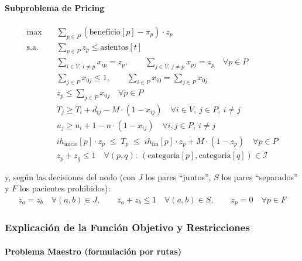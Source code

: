 \documentclass[12pt]{article}
\numberwithin{algorithm}{section}
\begin{document}
\paragraph{Subproblema de Pricing}

\begin{align}
  \max \quad & \sum_{p \in P} (\text{beneficio}[p] - \pi_p) \cdot z_p \label{eq:bp_pricing}\\
  \text{s.a.} \quad
  & \sum_{p \in P} z_p \leq \text{asientos}[t] \label{eq:pr_cap}\\
  & \sum_{i \in V,\, i \neq p} x_{ip} = z_p, \qquad \sum_{j \in V,\, j \neq p} x_{pj} = z_p \quad \forall p \in P \label{eq:pr_deg}\\
  & \sum_{j \in P} x_{0j} \leq 1, \qquad \sum_{i \in P} x_{i0} = \sum_{j \in P} x_{0j} \label{eq:pr_depot}\\
  & z_p \leq \sum_{j \in P} x_{0j} \quad \forall p \in P \label{eq:pr_ghost}\\
  & T_j \geq T_i + d_{ij} - M \cdot (1 - x_{ij}) \quad \forall i \in V,\ j \in P,\ i \neq j \label{eq:pr_time}\\
  & u_j \geq u_i + 1 - n \cdot (1 - x_{ij}) \quad \forall i, j \in P,\ i \neq j \label{eq:pr_mtz}\\
  & ih_{\text{inicio}}[p] \cdot z_p \;\leq\; T_p \;\leq\; ih_{\text{fin}}[p] \cdot z_p + M \cdot (1 - z_p) \quad \forall p \in P \label{eq:pr_tw}\\
  & z_p + z_q \leq 1 \quad \forall (p,q):\ (\text{categoria}[p], \text{categoria}[q]) \in \mathcal{I} \label{eq:pr_inc}
\end{align}

y, según las decisiones del nodo (con $J$ los pares ``juntos'', $S$ los pares ``separados'' y $F$ los pacientes prohibidos):
\begin{align}
  z_a = z_b \quad \forall (a,b) \in J, \qquad
  z_a + z_b \leq 1 \quad \forall (a,b) \in S, \qquad
  z_p = 0 \quad \forall p \in F \label{eq:pr_branch}
\end{align}

\subsubsection{Explicación de la Función Objetivo y Restricciones}

\paragraph{Problema Maestro (formulación por rutas)}
\end{document}

